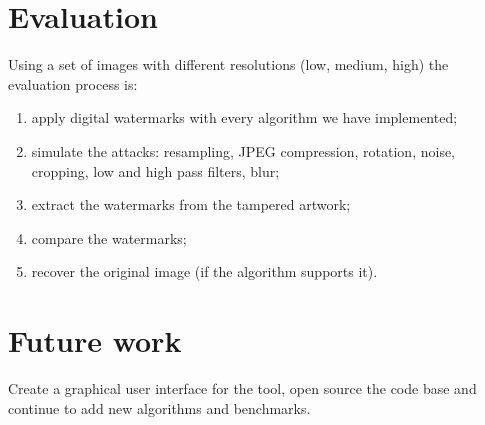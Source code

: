 \documentclass[10pt]{article}
\begin{document}
\section{Evaluation}
    Using a set of images with different resolutions (low, medium, high) the evaluation process is: 
    \begin{enumerate}
        \item apply digital watermarks with every algorithm we have implemented;
        \item simulate the attacks: resampling, JPEG compression, rotation, noise, cropping, low and high pass filters, blur;
        \item extract the watermarks from the tampered artwork;
        \item compare the watermarks;
        \item recover the original image (if the algorithm supports it).
    \end{enumerate}
    
\section{Future work}
    Create a graphical user interface for the tool, open source the code base and continue to add new algorithms and benchmarks.
\end{document}
